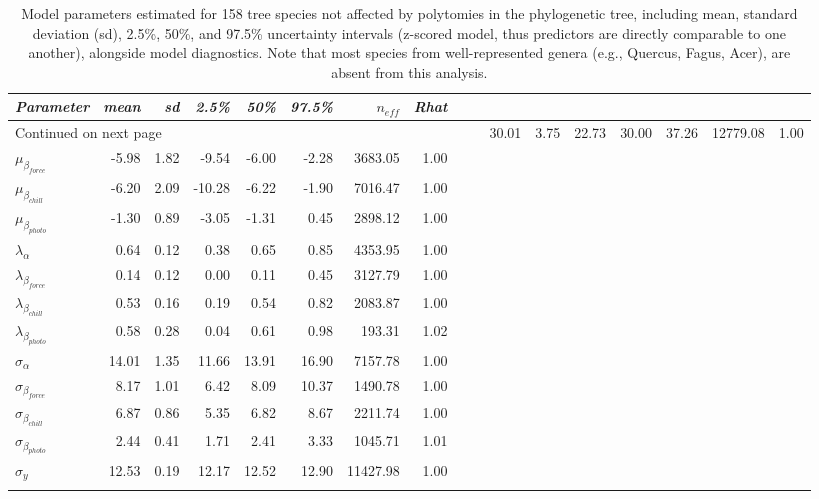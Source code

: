 \documentclass[11pt]{article}
\begin{document}
\begingroup\footnotesize
\begin{longtable}{lrrrrrrr}
\caption{Model parameters estimated for 158 tree species not affected by polytomies in the phylogenetic tree, including mean, standard deviation (sd), 2.5\%, 50\%, and 97.5\% uncertainty intervals (z-scored model, thus predictors are directly comparable to one another), alongside model diagnostics. Note that most species from well-represented genera (e.g., Quercus, Fagus, Acer), are absent from this analysis.} \\ 
  \hline
\emph{Parameter} & \emph{mean} & \emph{sd} & \emph{2.5\%} & \emph{50\%} & \emph{97.5\%} & \emph{$n_{eff}$} & \emph{Rhat} \\ 
  \hline
\endhead
\hline
\multicolumn{10}{l}{\footnotesize Continued on next page}
\endfoot
\endlastfoot
 \hline
\emph{$\mu_{\alpha}$} & 30.01 & 3.75 & 22.73 & 30.00 & 37.26 & 12779.08 & 1.00 \\ 
  \emph{$\mu_{\beta_{force}}$} & -5.98 & 1.82 & -9.54 & -6.00 & -2.28 & 3683.05 & 1.00 \\ 
  \emph{$\mu_{\beta_{chill}}$} & -6.20 & 2.09 & -10.28 & -6.22 & -1.90 & 7016.47 & 1.00 \\ 
  \emph{$\mu_{\beta_{photo}}$} & -1.30 & 0.89 & -3.05 & -1.31 & 0.45 & 2898.12 & 1.00 \\ 
  \emph{$\lambda_{\alpha}$} & 0.64 & 0.12 & 0.38 & 0.65 & 0.85 & 4353.95 & 1.00 \\ 
  \emph{$\lambda_{\beta_{force}}$} & 0.14 & 0.12 & 0.00 & 0.11 & 0.45 & 3127.79 & 1.00 \\ 
  \emph{$\lambda_{\beta_{chill}}$} & 0.53 & 0.16 & 0.19 & 0.54 & 0.82 & 2083.87 & 1.00 \\ 
  \emph{$\lambda_{\beta_{photo}}$} & 0.58 & 0.28 & 0.04 & 0.61 & 0.98 & 193.31 & 1.02 \\ 
  \emph{$\sigma_{\alpha}$} & 14.01 & 1.35 & 11.66 & 13.91 & 16.90 & 7157.78 & 1.00 \\ 
  \emph{$\sigma_{\beta_{force}}$} & 8.17 & 1.01 & 6.42 & 8.09 & 10.37 & 1490.78 & 1.00 \\ 
  \emph{$\sigma_{\beta_{chill}}$} & 6.87 & 0.86 & 5.35 & 6.82 & 8.67 & 2211.74 & 1.00 \\ 
  \emph{$\sigma_{\beta_{photo}}$} & 2.44 & 0.41 & 1.71 & 2.41 & 3.33 & 1045.71 & 1.01 \\ 
  \emph{$\sigma_y$} & 12.53 & 0.19 & 12.17 & 12.52 & 12.90 & 11427.98 & 1.00 \\ 
  \hline
\label{tab:modelnopolyt}
\end{longtable}
\endgroup \clearpage \pagebreak 
\end{document}
